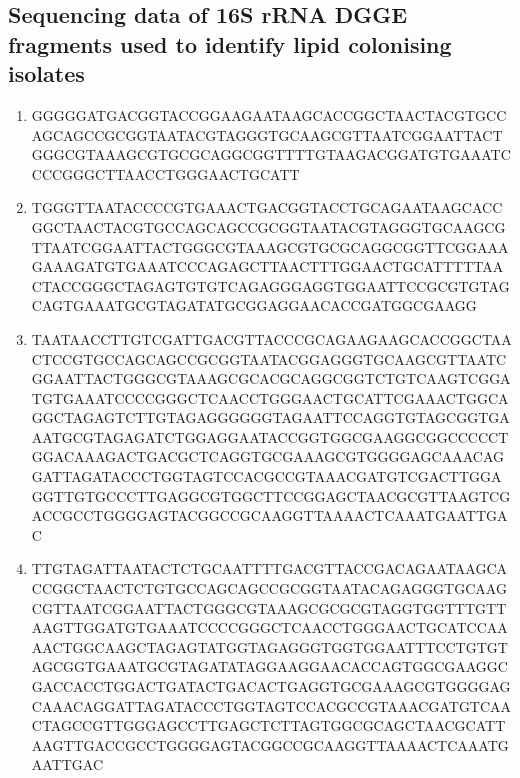 \documentclass[11pt]{article}
\begin{document}
\subsection{Sequencing data of 16S rRNA DGGE fragments used to identify lipid colonising isolates}
\begin{enumerate}
\item GGGGGATGACGGTACCGGAAGAATAAGCACCGGCTAACTACGTGCCAGCAGCCGCGGTAATACGTAGGGTGCAAGCGTTAATCGGAATTACTGGGCGTAAAGCGTGCGCAGGCGGTTTTGTAAGACGGATGTGAAATCCCCGGGCTTAACCTGGGAACTGCATT
\item TGGGTTAATACCCCGTGAAACTGACGGTACCTGCAGAATAAGCACCGGCTAACTACGTGCCAGCAGCCGCGGTAATACGTAGGGTGCAAGCGTTAATCGGAATTACTGGGCGTAAAGCGTGCGCAGGCGGTTCGGAAAGAAAGATGTGAAATCCCAGAGCTTAACTTTGGAACTGCATTTTTAACTACCGGGCTAGAGTGTGTCAGAGGGAGGTGGAATTCCGCGTGTAGCAGTGAAATGCGTAGATATGCGGAGGAACACCGATGGCGAAGG
\item TAATAACCTTGTCGATTGACGTTACCCGCAGAAGAAGCACCGGCTAACTCCGTGCCAGCAGCCGCGGTAATACGGAGGGTGCAAGCGTTAATCGGAATTACTGGGCGTAAAGCGCACGCAGGCGGTCTGTCAAGTCGGATGTGAAATCCCCGGGCTCAACCTGGGAACTGCATTCGAAACTGGCAGGCTAGAGTCTTGTAGAGGGGGGTAGAATTCCAGGTGTAGCGGTGAAATGCGTAGAGATCTGGAGGAATACCGGTGGCGAAGGCGGCCCCCTGGACAAAGACTGACGCTCAGGTGCGAAAGCGTGGGGAGCAAACAGGATTAGATACCCTGGTAGTCCACGCCGTAAACGATGTCGACTTGGAGGTTGTGCCCTTGAGGCGTGGCTTCCGGAGCTAACGCGTTAAGTCGACCGCCTGGGGAGTACGGCCGCAAGGTTAAAACTCAAATGAATTGAC
\item TTGTAGATTAATACTCTGCAATTTTGACGTTACCGACAGAATAAGCACCGGCTAACTCTGTGCCAGCAGCCGCGGTAATACAGAGGGTGCAAGCGTTAATCGGAATTACTGGGCGTAAAGCGCGCGTAGGTGGTTTGTTAAGTTGGATGTGAAATCCCCGGGCTCAACCTGGGAACTGCATCCAAAACTGGCAAGCTAGAGTATGGTAGAGGGTGGTGGAATTTCCTGTGTAGCGGTGAAATGCGTAGATATAGGAAGGAACACCAGTGGCGAAGGCGACCACCTGGACTGATACTGACACTGAGGTGCGAAAGCGTGGGGAGCAAACAGGATTAGATACCCTGGTAGTCCACGCCGTAAACGATGTCAACTAGCCGTTGGGAGCCTTGAGCTCTTAGTGGCGCAGCTAACGCATTAAGTTGACCGCCTGGGGAGTACGGCCGCAAGGTTAAAACTCAAATGAATTGAC
\end{enumerate}
\end{document}
